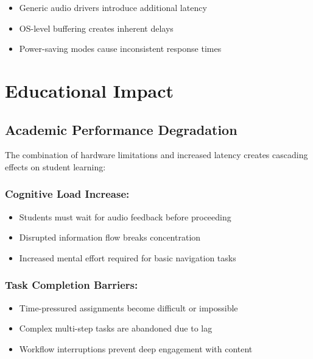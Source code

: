 \begin{itemize}
\item Generic audio drivers introduce additional latency \cite{ASIO4ALL2023Latency}
\item OS-level buffering creates inherent delays \cite{LinuxAudioLatency}
\item Power-saving modes cause inconsistent response times \cite{WindowsPowerManagement}
\end{itemize}


\section{Educational Impact}\label{educational-impact}

\subsection{Academic Performance Degradation}\label{academic-performance-degradation}

The combination of hardware limitations and increased latency creates cascading effects on student learning:

\subsubsection{Cognitive Load Increase:}
\begin{itemize}
\item Students must wait for audio feedback before proceeding \cite{Sweller1988CognitiveLoadTheory}
\item Disrupted information flow breaks concentration \cite{Parasuraman2008CognitiveWorkload}
\item Increased mental effort required for basic navigation tasks \cite{Wickens2008MultipleResourceTheory}
\end{itemize}

\subsubsection{Task Completion Barriers:}

\begin{itemize}
\item Time-pressured assignments become difficult or impossible \cite{Adams2000ImpactOfTechnology}
\item Complex multi-step tasks are abandoned due to lag \cite{Kirschner2006WhyMinimalGuidance}
\item Workflow interruptions prevent deep engagement with content \cite{Pashler1994DualTaskInterference}
\end{itemize}

